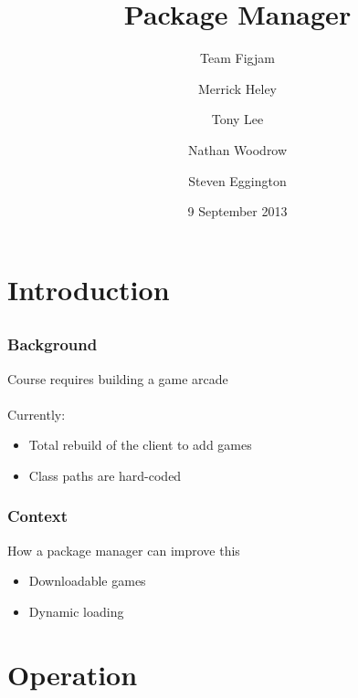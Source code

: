 \documentclass{beamer}
\title{Package Manager}
\subtitle{Team Figjam}
\author{\fontsize{10}{1}\selectfont
        Merrick Heley
        \and
        Tony Lee
        \and
        Nathan Woodrow
        \and
        Steven Eggington
        }
\institute{DECO2800 - Design Computing Studio 2}
\date{9 September 2013}
\begin{document}
\begin{frame}
    \titlepage
\end{frame}

\section{Introduction} %
\subsection{}

\begin{frame}
    \frametitle{Background}
    
    Course requires building a game arcade
    \\~\\
    Currently:
    
    \begin{itemize}
        \item   Total rebuild of the client to add games
        \item   Class paths are hard-coded
    \end{itemize}
    
\end{frame}

\begin{frame}
    \frametitle{Context}
    
    How a package manager can improve this
    \begin{itemize}
        \item   Downloadable games
        \item   Dynamic loading
    \end{itemize}
    
\end{frame}

\section{Operation} %
\subsection{}
\end{document}
